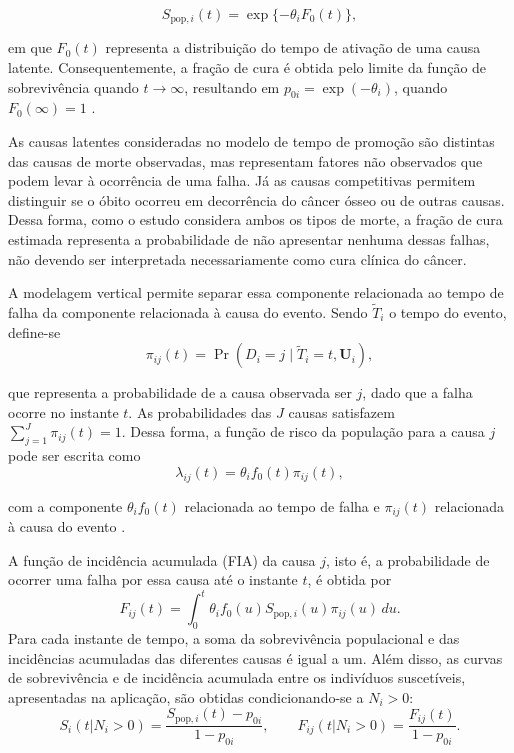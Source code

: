 \documentclass[11pt,a4paper]{article}
\newcommand{\Prb}{\operatorname{Pr}}
\begin{document}
$$
S_{\mathrm{pop},i}(t)=\exp\{{-\theta_iF_0(t)}\},
$$

\noindent em que $F_0(t)$ representa a distribuição do tempo de ativação de uma causa latente. Consequentemente, a fração de cura é obtida pelo limite da função de sobrevivência quando $t\rightarrow\infty$, resultando em $p_{0i}=\exp(-\theta_i)$, quando $F_0(\infty)=1$ \citep{Yakovlev1996}.

As causas latentes consideradas no modelo de tempo de promoção são distintas das causas de morte observadas, mas representam fatores não observados que podem levar à ocorrência de uma falha. Já as causas competitivas permitem distinguir se o óbito ocorreu em decorrência do câncer ósseo ou de outras causas. Dessa forma, como o estudo considera ambos os tipos de morte, a fração de cura estimada representa a probabilidade de não apresentar nenhuma dessas falhas, não devendo ser interpretada necessariamente como cura clínica do câncer.


A modelagem vertical permite separar essa componente relacionada ao tempo de falha da componente relacionada à causa do evento. Sendo $\widetilde T_i$ o tempo do evento, define-se
$$
\pi_{ij}(t)
 =\Prb(D_i=j\mid\widetilde T_i=t,\bm U_i),
$$

\noindent que representa a probabilidade de a causa observada ser $j$, dado que a falha ocorre no instante $t$. As probabilidades das $J$ causas satisfazem $\sum_{j=1}^{J}\pi_{ij}(t)=1$. Dessa forma, a função de risco da população para a causa $j$ pode ser escrita como
$$
\lambda_{ij}(t)=\theta_i f_0(t)\pi_{ij}(t),
$$

\noindent com a componente $\theta_i f_0(t)$ relacionada ao tempo de falha e $\pi_{ij}(t)$ relacionada à causa do evento \citep{nicolaie2010vertical}.

A função de incidência acumulada (FIA) da causa $j$, isto é, a probabilidade de ocorrer uma falha por essa causa até o instante $t$, é obtida por
\begin{equation}
F_{ij}(t)=\int_0^t \theta_i f_0(u) S_{\mathrm{pop},i}(u)\pi_{ij}(u)\,du.
\end{equation}
Para cada instante de tempo, a soma da sobrevivência populacional e das incidências acumuladas das diferentes causas é igual a um. Além disso, as curvas de sobrevivência e de incidência acumulada entre os indivíduos suscetíveis, apresentadas na aplicação, são obtidas condicionando-se a $N_i>0$:
\begin{equation}
S_{i}(t|N_i>0)=\frac{S_{\mathrm{pop},i}(t)-p_{0i}}{1-p_{0i}},
\qquad
F_{ij}(t|N_i>0)=\frac{F_{ij}(t)}{1-p_{0i}}.
\end{equation}
\end{document}

